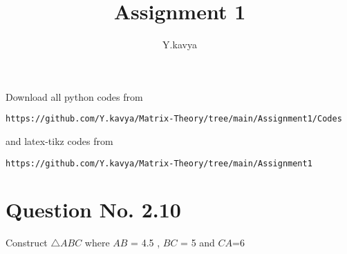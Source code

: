 \documentclass[journal,12pt,twocolumn]{IEEEtran}
\begin{document}
     \def\rightbox#1{\makebox[0in][r]{#1}}
     \def\centbox#1{\makebox[0in]{#1}}
     \def\topbox#1{\raisebox{-\baselineskip}[0in][0in]{#1}}
     \def\midbox#1{\raisebox{-0.5\baselineskip}[0in][0in]{#1}}
\vspace{3cm}
\title{Assignment 1}
\author{Y.kavya}
\maketitle
\newpage
\bigskip
\renewcommand{\thefigure}{\theenumi}
\renewcommand{\thetable}{\theenumi}
Download all python codes from 
\begin{lstlisting}
https://github.com/Y.kavya/Matrix-Theory/tree/main/Assignment1/Codes
\end{lstlisting}
%
and latex-tikz codes from 
%
\begin{lstlisting}
https://github.com/Y.kavya/Matrix-Theory/tree/main/Assignment1
\end{lstlisting}
%
\section{Question No. 2.10}
Construct $\triangle ABC$  where
$AB$ = 4.5 , $BC$ = 5  and $CA$=6
%
\end{document}
